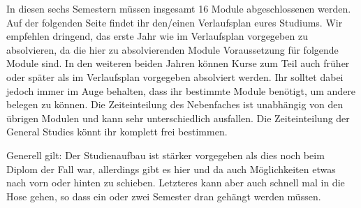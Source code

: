 In diesen sechs Semestern müssen insgesamt 16 Module abgeschlossenen werden. Auf der folgenden Seite ﬁndet ihr den/einen Verlaufsplan eures Studiums. Wir empfehlen dringend, das erste Jahr wie im Verlaufsplan vorgegeben zu absolvieren, da die hier zu absolvierenden Module Voraussetzung für folgende Module sind. In den weiteren beiden Jahren können Kurse zum Teil auch früher oder später als im Verlaufsplan vorgegeben absolviert werden. Ihr solltet dabei jedoch immer im Auge behalten, dass ihr bestimmte Module benötigt, um andere belegen zu können. Die Zeiteinteilung des Nebenfaches ist unabhängig von den übrigen Modulen und kann sehr unterschiedlich ausfallen. Die Zeiteinteilung der General Studies könnt ihr komplett frei bestimmen.

Generell gilt: Der Studienaufbau ist stärker vorgegeben als dies noch beim Diplom der Fall war, allerdings gibt es hier und da auch Möglichkeiten etwas nach vorn oder hinten zu schieben. Letzteres kann aber auch schnell mal in die Hose gehen, so dass ein oder zwei Semester dran gehängt werden müssen.


